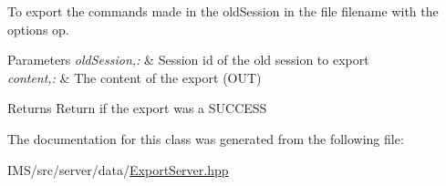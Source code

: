 To export the commands made in the oldSession in the file filename with the options op. 


\begin{DoxyParams}{Parameters}
{\em oldSession,:} & Session id of the old session to export \\
\hline
{\em content,:} & The content of the export (OUT) \\
\hline
\end{DoxyParams}
\begin{DoxyReturn}{Returns}
Return if the export was a SUCCESS 
\end{DoxyReturn}


The documentation for this class was generated from the following file:\begin{DoxyCompactItemize}
\item 
IMS/src/server/data/\hyperlink{ExportServer_8hpp}{ExportServer.hpp}\end{DoxyCompactItemize}
